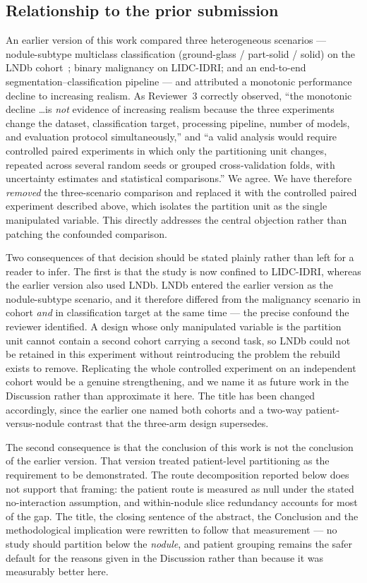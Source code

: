 \documentclass{ieeeaccess}
\newcommand{\vcite}[1]{\cite{#1}}
\begin{document}
\subsection{Relationship to the prior submission}
An earlier version of this work compared three heterogeneous scenarios --- nodule-subtype
multiclass classification (ground-glass / part-solid / solid) on the LNDb cohort~\vcite{pedrosa2021}; binary malignancy on LIDC-IDRI; and an end-to-end
segmentation--classification pipeline --- and attributed a monotonic
performance decline to increasing realism. As Reviewer~3 correctly observed, ``the monotonic
decline \ldots is \emph{not} evidence of increasing realism because the three experiments change
the dataset, classification target, processing pipeline, number of models, and evaluation protocol
simultaneously,'' and ``a valid analysis would require controlled paired experiments in which only
the partitioning unit changes, repeated across several random seeds or grouped cross-validation
folds, with uncertainty estimates and statistical comparisons.'' We agree. We have therefore
\emph{removed} the three-scenario comparison and replaced it with the controlled paired experiment
described above, which isolates the partition unit as the single manipulated variable. This
directly addresses the central objection rather than patching the confounded comparison.

Two consequences of that decision should be stated plainly rather than left for a reader to infer.
The first is that the study is now confined to LIDC-IDRI, whereas the earlier version also used
LNDb. LNDb entered the earlier version as the nodule-subtype scenario, and it therefore differed
from the malignancy scenario in cohort \emph{and} in classification target at the same time --- the
precise confound the reviewer identified. A design whose only manipulated variable is the partition
unit cannot contain a second cohort carrying a second task, so LNDb could not be retained in this
experiment without reintroducing the problem the rebuild exists to remove. Replicating the whole
controlled experiment on an independent cohort would be a genuine strengthening, and we name it as
future work in the Discussion rather than approximate it here. The title has been changed
accordingly, since the earlier one named both cohorts and a two-way patient-versus-nodule contrast
that the three-arm design supersedes.

The second consequence is that the conclusion of this work is not the conclusion of the earlier
version. That version treated patient-level partitioning as the requirement to be demonstrated.
The route decomposition reported below does not support that framing: the patient route is measured
as null under the stated no-interaction assumption, and within-nodule slice redundancy accounts for
most of the gap. The title, the closing sentence of the abstract, the Conclusion and the
methodological implication were rewritten to follow that measurement --- no study should partition
below the \emph{nodule}, and patient grouping remains the safer default for the reasons given in
the Discussion rather than because it was measurably better here.
\end{document}
